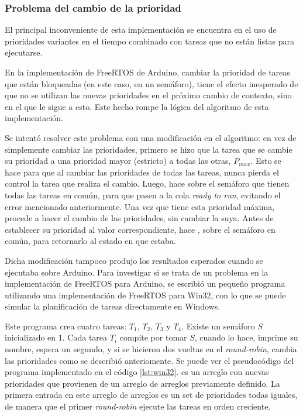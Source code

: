 	\subsubsection{Problema del cambio de la prioridad}

		El principal inconveniente de esta implementación se encuentra en el uso de prioridades variantes en el tiempo combinado con tareas que no están listas para ejecutarse.

		En la implementación de FreeRTOS de Arduino, cambiar la prioridad de tareas que están bloqueadas (en este caso, en un semáforo), tiene el efecto inesperado de que no se utilizan las nuevas prioridades en el próximo cambio de contexto, sino en el que le sigue a esto.
		Este hecho rompe la lógica del algoritmo de esta implementación.

		Se intentó resolver este problema con una modificación en el algoritmo: en vez de simplemente cambiar las prioridades, primero se hizo que la tarea que se cambie su prioridad a una prioridad mayor (estricto) a todas las otras, $P_{max}$.
		Esto se hace para que al cambiar las prioridades de todas las tareas, nunca pierda el control la tarea que realiza el cambio.
		Luego, hace  sobre el semáforo que tienen todas las tareas en común, para que pasen a la cola \emph{ready to run}, evitando el error mencionado anteriormente.
		Una vez que tiene esta prioridad máxima, procede a hacer el cambio de las prioridades, sin cambiar la suya.
		Antes de establecer su prioridad al valor correspondiente, hace , sobre el semáforo en común, para retornarlo al estado en que estaba.

		Dicha modificación tampoco produjo los resultados esperados cuando se ejecutaba sobre Arduino.
		Para investigar si se trata de un problema en la implementación de FreeRTOS para Arduino, se escribió un pequeño programa utilizando una implementación de FreeRTOS para Win32, con lo que se puede simular la planificación de tareas directamente en Windows.

		Este programa crea cuatro tareas: $T_1$, $T_2$, $T_3$ y $T_4$.
		Existe un semáforo $S$ inicializado en 1.
		Cada tarea $T_i$ compite por tomar $S$, cuando lo hace, imprime su nombre, espera un segundo, y si se hicieron dos vueltas en el \emph{round-robin}, cambia las prioridades como se describió anteriomente.
		Se puede ver el pseudocódigo del programa implementado en el código \ref{lst:win32}.
		 es un arreglo con nuevas prioridades que provienen de un arreglo de arreglos previamente definido.
		La primera entrada en este arreglo de arreglos es un set de prioridades todas iguales, de manera que el primer \emph{round-robin} ejecute las tareas en orden creciente.

